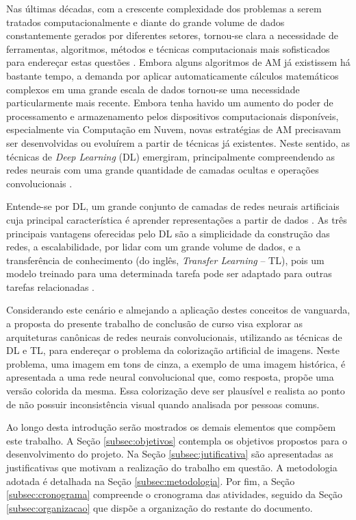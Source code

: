 Nas últimas décadas, com a crescente complexidade dos problemas a serem tratados computacionalmente e diante do grande volume de dados constantemente gerados por diferentes setores, tornou-se clara a necessidade de ferramentas, algoritmos, métodos e técnicas computacionais mais sofisticados para endereçar estas questões \cite{ref:faceli}. Embora alguns algoritmos de AM já existissem há bastante tempo, a demanda por aplicar automaticamente cálculos matemáticos complexos em uma grande escala de dados tornou-se uma necessidade particularmente mais recente. Embora tenha havido um aumento do poder de processamento e armazenamento pelos dispositivos computacionais disponíveis, especialmente via Computação em Nuvem, novas estratégias de AM precisavam ser desenvolvidas ou evoluírem a partir de técnicas já existentes. Neste sentido, as técnicas de \emph{Deep Learning} (DL) emergiram, principalmente compreendendo as redes neurais com uma grande quantidade de camadas ocultas e operações convolucionais \cite{ref:khan}.

Entende-se por DL, um grande conjunto de camadas de redes neurais artificiais cuja principal característica é aprender representações a partir de dados \cite{ref:buduma,ref:chollet}.  As três principais vantagens oferecidas pelo DL são a simplicidade da construção das redes, a escalabilidade, por lidar com um grande volume de dados, e a transferência de conhecimento (do inglês, \textit{Transfer Learning} -- TL), pois um modelo treinado para uma determinada tarefa pode ser adaptado para outras tarefas relacionadas \cite{ref:khan}.

Considerando este cenário e almejando a aplicação destes conceitos de vanguarda, a proposta do presente trabalho de conclusão de curso visa explorar as arquiteturas canônicas de redes neurais convolucionais, utilizando as técnicas de DL e TL, para endereçar o problema da colorização artificial de imagens. Neste problema, uma imagem em tons de cinza, a exemplo de uma imagem histórica, é apresentada a uma rede neural convolucional que, como resposta, propõe uma versão colorida da mesma. Essa colorização deve ser plausível e realista ao ponto de não possuir inconsistência visual quando analisada por pessoas comuns.

Ao longo desta introdução serão mostrados os demais elementos que compõem este trabalho. A Seção \ref{subsec:objetivos} contempla os objetivos propostos para o desenvolvimento do projeto. Na Seção \ref{subsec:jutificativa} são apresentadas as justificativas  que motivam a realização do trabalho em questão. A metodologia adotada é detalhada na Seção \ref{subsec:metodologia}. Por fim, a Seção \ref{subsec:cronograma}  compreende o cronograma das atividades, seguido da Seção \ref{subsec:organizacao} que dispõe a organização do restante do documento.

